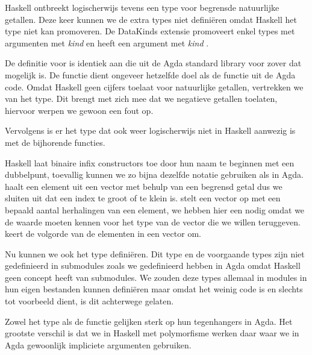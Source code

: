 Haskell ontbreekt logischerwijs tevens een type voor begrensde natuurlijke
getallen. Deze keer kunnen we de extra types niet definiëren omdat Haskell het
 type niet kan promoveren. De DataKinds extensie promoveert enkel
types met argumenten met \emph{kind} \ihask{*} en  heeft een argument met
\emph{kind} .


De definitie voor  is identiek aan die uit de Agda standard library
voor zover dat mogelijk is. De functie  dient ongeveer
hetzelfde doel als de  functie uit de Agda code. Omdat Haskell
geen cijfers toelaat voor natuurlijke getallen, vertrekken we van het
 type. Dit brengt met zich mee dat we negatieve getallen
toelaten, hiervoor werpen we gewoon een fout op.

Vervolgens is er het type  dat ook weer logischerwijs niet in
Haskell aanwezig is met de bijhorende functies.


Haskell laat binaire infix constructors toe door hun naam te beginnen met een
dubbelpunt, toevallig kunnen we zo bijna dezelfde notatie gebruiken als in
Agda.  haalt een element uit een vector met behulp van een
begrensd getal dus we sluiten uit dat een index te groot of te klein is.
 stelt een vector op met een bepaald aantal herhalingen van
een element, we hebben hier een  nodig omdat we de waarde
 moeten kennen voor het type van de vector die we willen teruggeven.
 keert de volgorde van de elementen in een vector om.

Nu kunnen we ook het  type definiëren. Dit type en de voorgaande
types zijn niet gedefinieerd in submodules zoals we  gedefinieerd
hebben in Agda omdat Haskell geen concept heeft van submodules. We zouden deze
types allemaal in modules in hun eigen bestanden kunnen definiëren maar omdat
het weinig code is en slechts tot voorbeeld dient, is dit achterwege gelaten.


Zowel het  type als de  functie gelijken sterk op
hun tegenhangers in Agda. Het grootste verschil is dat we in Haskell met
polymorfisme werken daar waar we in Agda gewoonlijk impliciete argumenten
gebruiken.

